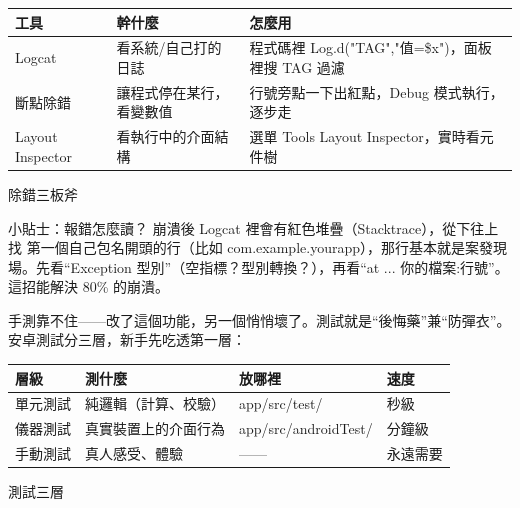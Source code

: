 


\begin{center}
\begin{tabularx}{\linewidth}{|X|X|X|}
\hline
\textbf{工具} & \textbf{幹什麼} & \textbf{怎麼用} \tabularnewline
\hline
Logcat & 看系統/自己打的日誌 & 程式碼裡 Log.d("TAG","值=\$x")，面板裡搜 TAG 過濾 \tabularnewline
斷點除錯 & 讓程式停在某行，看變數值 & 行號旁點一下出紅點，Debug 模式執行，逐步走 \tabularnewline
Layout Inspector & 看執行中的介面結構 & 選單 Tools Layout Inspector，實時看元件樹 \tabularnewline
\hline
\end{tabularx}
\end{center}

\begin{center}\small\color{gray}除錯三板斧\end{center}

\begin{tcbinfo}{小貼士：報錯怎麼讀？}
崩潰後 Logcat 裡會有紅色堆疊（Stacktrace），從下往上找 第一個自己包名開頭的行（比如 com.example.yourapp），那行基本就是案發現場。先看“Exception 型別”（空指標？型別轉換？），再看“at ... 你的檔案:行號”。這招能解決 80\% 的崩潰。

\end{tcbinfo}


手測靠不住——改了這個功能，另一個悄悄壞了。測試就是“後悔藥”兼“防彈衣”。安卓測試分三層，新手先吃透第一層：

\begin{center}
\begin{tabularx}{\linewidth}{|X|X|X|X|}
\hline
\textbf{層級} & \textbf{測什麼} & \textbf{放哪裡} & \textbf{速度} \tabularnewline
\hline
單元測試 & 純邏輯（計算、校驗） & app/src/test/ & 秒級 \tabularnewline
儀器測試 & 真實裝置上的介面行為 & app/src/androidTest/ & 分鐘級 \tabularnewline
手動測試 & 真人感受、體驗 & —— & 永遠需要 \tabularnewline
\hline
\end{tabularx}
\end{center}

\begin{center}\small\color{gray}測試三層\end{center}

